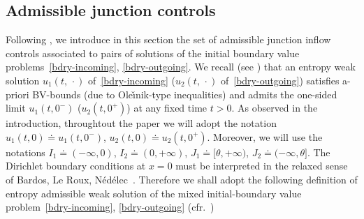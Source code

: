 \documentclass[a4paper, 10pt, final]{article}
\begin{document}
\subsection{Admissible junction controls}
\label{sec:bvp}
Following \cite{accg}, we introduce in this section the set of admissible junction inflow controls
associated to pairs of solutions of the initial boundary value problems~\eqref{bdry-incoming}, \eqref{bdry-outgoing}.
We recall  (see \cite[Remark~2.3]{accg}) that  an entropy weak solution $u_1(t,\,\cdot)$
of~\eqref{bdry-incoming} ($u_2(t,\,\cdot)$ of~\eqref{bdry-outgoing}) satisfies a-priori
BV-bounds (due to Ole\v{\i}nik-type inequalities) and  admits the one-sided limit $u_1(t,0^-)$ ($u_2(t,0^+)$) 
at any fixed time $t>0$.
As observed in the introduction, 
throughtout the paper we will adopt the notation $u_1(t,0)\doteq u_1(t,0^-)$, $u_2(t,0)\doteq u_2(t,0^+)$.
Moreover, we will use the notations
$I_1\doteq (-\infty, 0)$, $I_2\doteq (0, +\infty)$, $J_1\doteq [\theta,+\infty)$, $J_2\doteq (-\infty,\theta]$.
The Dirichlet boundary conditions at $x=0$ must be
interpreted in the relaxed sense 
of Bardos, Le Roux, N\'ed\'elec~\cite{BLN}.
Therefore we shall adopt the following
definition of entropy admissible weak solution of the mixed initial-boundary
value problem~\eqref{bdry-incoming}, \eqref{bdry-outgoing} (cfr.~\cite{lf})
%
\end{document}

